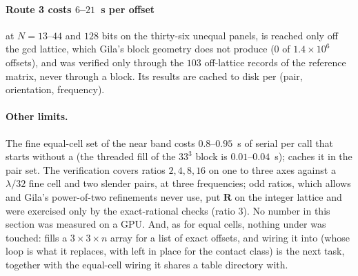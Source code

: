 \paragraph{Route 3 costs $6$--$21$~s per offset} at $N = 13$--$44$ and $128$ bits on the
thirty-six unequal panels, is reached only off the gcd lattice, which Gila's block geometry
does not produce ($0$ of $1.4\times10^{6}$ offsets), and was verified only through the
$103$ off-lattice records of the reference matrix, never through a block. Its results are
cached to disk per (pair, orientation, frequency).

\paragraph{Other limits.} The fine equal-cell set of the near band costs $0.8$--$0.95$~s of
serial  per  call that starts without a 
(the threaded fill of the $33^3$ block is $0.01$--$0.04$~s);  caches it in
the pair set. The verification covers ratios $2,4,8,16$ on one to three axes against a
$\lambda/32$ fine cell and two slender pairs, at three frequencies; odd ratios, which
 allows and Gila's power-of-two refinements never use, put $\mathbf{R}$ on
the integer lattice and were exercised only by the exact-rational checks (ratio $3$). No
number in this section was measured on a GPU. And, as for equal cells, nothing under
 was touched:  fills a $3\times3\times n$ array for a list of
exact offsets, and wiring it into  (whose  loop is
what it replaces, with  left in place for the contact class) is the next
task, together with the equal-cell wiring it shares a table directory with.
